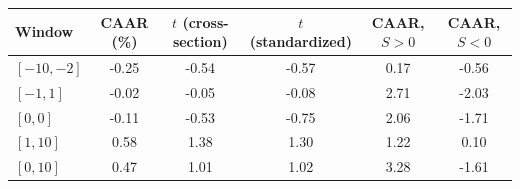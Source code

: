 \begin{tabular}{lccccc}\toprule
Window & CAAR (\%) & $t$ (cross-section) & $t$ (standardized) & CAAR, $S>0$ & CAAR, $S<0$ \\ \midrule
$[-10, -2]$ & -0.25 & -0.54 & -0.57 & 0.17 & -0.56 \\
$[-1, 1]$ & -0.02 & -0.05 & -0.08 & 2.71 & -2.03 \\
$[0, 0]$ & -0.11 & -0.53 & -0.75 & 2.06 & -1.71 \\
$[1, 10]$ & 0.58 & 1.38 & 1.30 & 1.22 & 0.10 \\
$[0, 10]$ & 0.47 & 1.01 & 1.02 & 3.28 & -1.61 \\
\bottomrule\end{tabular}
